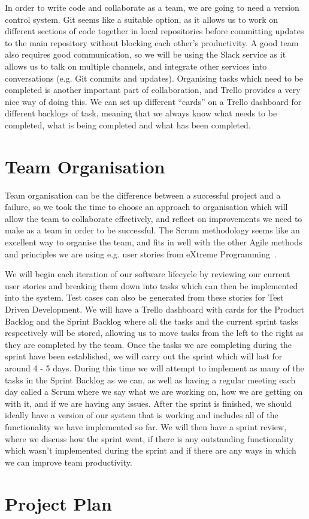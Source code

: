 In order to write code and collaborate as a team, we are going to need a version control system.
Git seems like a suitable option, as it allows us to work on different sections of code together in local repositories before committing updates to the main repository without blocking each other's productivity.
A good team also requires good communication, so we will be using the Slack service as it allows us to talk on multiple channels, and integrate other services into conversations (e.g. Git commits and updates).
Organising tasks which need to be completed is another important part of collaboration, and Trello provides a very nice way of doing this.
We can set up different “cards” on a Trello dashboard for different backlogs of task, meaning that we always know what needs to be completed, what is being completed and what has been completed.

\section{Team Organisation}

Team organisation can be the difference between a successful project and a failure, so we took the time to choose an approach to organisation which will allow the team to collaborate effectively, and reflect on improvements we need to make as a team in order to be successful.
The Scrum methodology seems like an excellent way to organise the team, and fits in well with the other Agile methods and principles we are using e.g. user stories from eXtreme Programming~\cite{sommerville2016software}.

We will begin each iteration of our software lifecycle by reviewing our current user stories and breaking them down into tasks which can then be implemented into the system.
Test cases can also be generated from these stories for Test Driven Development.
We will have a Trello dashboard with cards for the Product Backlog and the Sprint Backlog where all the tasks and the current sprint tasks respectively will be stored, allowing us to move tasks from the left to the right as they are completed by the team.
Once the tasks we are completing during the sprint have been established, we will carry out the sprint which will last for around 4 - 5 days.
During this time we will attempt to implement as many of the tasks in the Sprint Backlog as we can, as well as having a regular meeting each day called a Scrum where we say what we are working on, how we are getting on with it, and if we are having any issues.
After the sprint is finished, we should ideally have a version of our system that is working and includes all of the functionality we have implemented so far.
We will then have a sprint review, where we discuss how the sprint went, if there is any outstanding functionality which wasn't implemented during the sprint and if there are any ways in which we can improve team productivity. 

\section{Project Plan}


